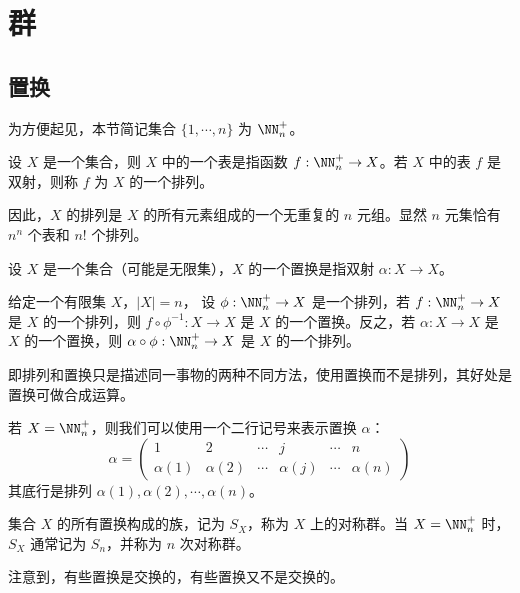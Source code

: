 \chapter{群}

\section{置换}

\newcommand\NNn{\NN_n^{+}}

为方便起见，本节简记集合 $\{1,\cdots,n\}$ 为 $\NNn$。

\begin{definition}
    设 $X$ 是一个集合，则 $X$ 中的一个表是指函数 $f:\NNn \to X$。若 $X$ 中的表 $f$ 是双射，则称 $f$ 为 $X$ 的一个排列。
\end{definition}

因此，$X$ 的排列是 $X$ 的所有元素组成的一个无重复的 $n$ 元组。显然 $n$ 元集恰有 $n^n$ 个表和 $n!$ 个排列。

\begin{definition}[置换]
    设 $X$ 是一个集合（可能是无限集），$X$ 的一个置换是指双射 $\alpha : X \to X$。
\end{definition}

给定一个有限集 $X$，$|X|=n$， 设 $\phi : \NNn \to X$ 是一个排列，若 $f : \NNn \to X$ 是 $X$ 的一个排列，则 $f \circ \phi^{-1} : X \to X$ 是 $X$ 的一个置换。反之，若 $\alpha : X \to X$ 是 $X$ 的一个置换，则 $\alpha \circ \phi : \NNn \to X$ 是 $X$ 的一个排列。

即排列和置换只是描述同一事物的两种不同方法，使用置换而不是排列，其好处是置换可做合成运算。

若 $X = \NNn$，则我们可以使用一个二行记号来表示置换 $\alpha$：
\[\alpha = \left(\begin{matrix}
    1 & 2 & \cdots & j & \cdots & n\\
    \alpha(1) & \alpha(2) & \cdots & \alpha(j) & \cdots & \alpha(n)
\end{matrix}\right)\]
其底行是排列 $\alpha(1) , \alpha(2) , \cdots , \alpha(n)$。

\begin{definition}[对称群]
    集合 $X$ 的所有置换构成的族，记为 $S_X$，称为 $X$ 上的对称群。当 $X = \NNn$ 时， $S_X$ 通常记为 $S_n$，并称为 $n$ 次对称群。
\end{definition}

注意到，有些置换是交换的，有些置换又不是交换的。







\let\NNn\relax
